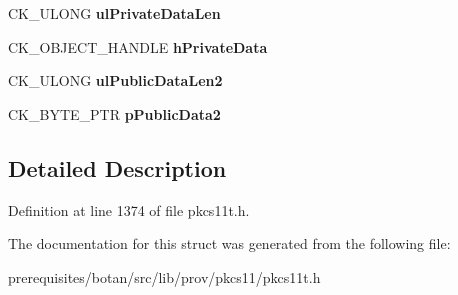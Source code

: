 \begin{DoxyCompactItemize}
C\+K\+\_\+\+U\+L\+O\+NG {\bfseries ul\+Private\+Data\+Len}
\item 
\mbox{\label{struct_c_k___x9__42___d_h2___d_e_r_i_v_e___p_a_r_a_m_s_af7f9986bdf98412d3dcfff901392afb9}} 
C\+K\+\_\+\+O\+B\+J\+E\+C\+T\+\_\+\+H\+A\+N\+D\+LE {\bfseries h\+Private\+Data}
\item 
\mbox{\label{struct_c_k___x9__42___d_h2___d_e_r_i_v_e___p_a_r_a_m_s_ac76cae55438971946095a6d59ddfe376}} 
C\+K\+\_\+\+U\+L\+O\+NG {\bfseries ul\+Public\+Data\+Len2}
\item 
\mbox{\label{struct_c_k___x9__42___d_h2___d_e_r_i_v_e___p_a_r_a_m_s_a9a073b51cd21a777a3acf6df9d759bd4}} 
C\+K\+\_\+\+B\+Y\+T\+E\+\_\+\+P\+TR {\bfseries p\+Public\+Data2}
\end{DoxyCompactItemize}


\subsection{Detailed Description}


Definition at line 1374 of file pkcs11t.\+h.



The documentation for this struct was generated from the following file\+:\begin{DoxyCompactItemize}
\item 
prerequisites/botan/src/lib/prov/pkcs11/pkcs11t.\+h\end{DoxyCompactItemize}
